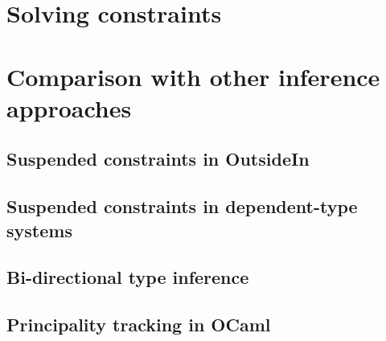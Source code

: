 \documentclass[acmsmall,screen,nonacm]{acmart}
\begin{document}
\section{Solving constraints}

\section{Comparison with other inference approaches}

\subsection{Suspended constraints in OutsideIn}
\subsection{Suspended constraints in dependent-type systems}
\subsection{Bi-directional type inference}
\subsection{Principality tracking in OCaml}



\end{document}
